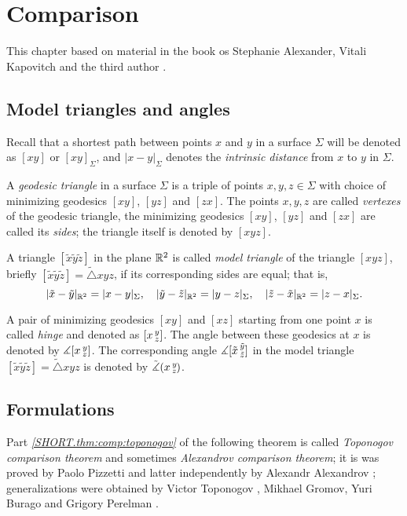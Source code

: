 \chapter{Comparison}

This chapter based on material in the book os Stephanie Alexander, Vitali Kapovitch and the third author \cite{alexander-kapovitch-petrunin2027}.

\section{Model triangles and angles}

Recall that a shortest path between points $x$ and $y$ in a surface $\Sigma$ will be denoted as $[xy]$ or $[xy]_\Sigma$, and
$|x-y|_\Sigma$ denotes the \emph{intrinsic distance} from $x$ to $y$ in $\Sigma$.

A \emph{geodesic triangle} in a surface $\Sigma$ is a triple of points $x,y,z\in \Sigma$ with choice of minimizing geodesics $[xy]$, $[yz]$ and $[zx]$.
The points $x,y,z$ are called {}\emph{vertexes} of the geodesic triangle,
the minimizing geodesics $[xy]$, $[yz]$ and $[zx]$ are called its {}\emph{sides};
the triangle itself is denoted by $[xyz]$.

A triangle $[\tilde x\tilde y\tilde z]$ in the plane $\mathbb{R}^2$ is called \emph{model triangle} of the triangle $[xyz]$,
briefly $[\tilde x\tilde y\tilde z]=\tilde \triangle xyz$, if its corresponding sides are equal;
that is,
\[|\tilde x-\tilde y|_{\mathbb{R}^2}=|x-y|_\Sigma,
\quad
|\tilde y-\tilde z|_{\mathbb{R}^2}=|y-z|_\Sigma,
\quad
|\tilde z-\tilde x|_{\mathbb{R}^2}=|z-x|_\Sigma.
\]

A pair of minimizing geodesics $[xy]$ and $[xz]$ starting from one point $x$ is called \emph{hinge} and denoted as $[x\,{}^{y}_{z}]$.
The angle between these geodesics at $x$ is denoted by $\measuredangle[x\,{}^{y}_{z}]$.
The corresponding angle $\measuredangle[\tilde x\,{}^{\tilde y}_{\tilde z}]$ in the model triangle $[\tilde x\tilde y\tilde z]=\tilde \triangle xyz$ is denoted by $\tilde\measuredangle(x\,{}^{y}_{z}\hspace{-0.2ex})$.

\section{Formulations}

Part \textit{\ref{SHORT.thm:comp:toponogov}} of the following theorem is called \emph{Toponogov comparison theorem} and sometimes \emph{Alexandrov comparison theorem};
it is was proved by Paolo Pizzetti \cite{pizzetti} and latter independently by Alexandr Alexandrov \cite{alexandrov}; 
generalizations were obtained by  Victor Toponogov \cite{toponogov}, Mikhael Gromov, Yuri Burago and Grigory Perelman \cite{BGP}.


